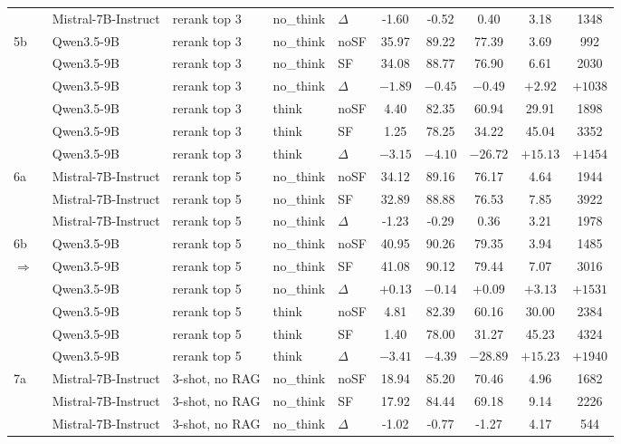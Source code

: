 \begin{scriptsize}
\begin{longtable}{l l l l l c c c c c}
 & Mistral-7B-Instruct & rerank top 3 & no\_think & $\Delta$ & -1.60 & -0.52 & 0.40 & 3.18 & 1348 \\
5b & Qwen3.5-9B & rerank top 3 & no\_think & noSF & 35.97 & 89.22 & 77.39 & 3.69 & 992 \\
 & Qwen3.5-9B & rerank top 3 & no\_think & SF & 34.08 & 88.77 & 76.90 & 6.61 & 2030 \\
 & Qwen3.5-9B & rerank top 3 & no\_think & $\Delta$ & $-1.89$ & $-0.45$ & $-0.49$ & $+2.92$ & $+1038$ \\
 & Qwen3.5-9B & rerank top 3 & think & noSF & 4.40 & 82.35 & 60.94 & 29.91 & 1898 \\
 & Qwen3.5-9B & rerank top 3 & think & SF & 1.25 & 78.25 & 34.22 & 45.04 & 3352 \\
 & Qwen3.5-9B & rerank top 3 & think & $\Delta$ & $-3.15$ & $-4.10$ & $-26.72$ & $+15.13$ & $+1454$ \\
\dmidrule
6a & Mistral-7B-Instruct & rerank top 5 & no\_think & noSF & 34.12 & 89.16 & 76.17 & 4.64 & 1944 \\
 & Mistral-7B-Instruct & rerank top 5 & no\_think & SF & 32.89 & 88.88 & 76.53 & 7.85 & 3922 \\
 & Mistral-7B-Instruct & rerank top 5 & no\_think & $\Delta$ & -1.23 & -0.29 & 0.36 & 3.21 & 1978 \\
6b & Qwen3.5-9B & rerank top 5 & no\_think & noSF & 40.95 & 90.26 & 79.35 & 3.94 & 1485 \\
\rowcolor{tabhighlight}$\Rightarrow$~ & Qwen3.5-9B & rerank top 5 & no\_think & SF & 41.08 & 90.12 & 79.44 & 7.07 & 3016 \\
 & Qwen3.5-9B & rerank top 5 & no\_think & $\Delta$ & $+0.13$ & $-0.14$ & $+0.09$ & $+3.13$ & $+1531$ \\
 & Qwen3.5-9B & rerank top 5 & think & noSF & 4.81 & 82.39 & 60.16 & 30.00 & 2384 \\
 & Qwen3.5-9B & rerank top 5 & think & SF & 1.40 & 78.00 & 31.27 & 45.23 & 4324 \\
 & Qwen3.5-9B & rerank top 5 & think & $\Delta$ & $-3.41$ & $-4.39$ & $-28.89$ & $+15.23$ & $+1940$ \\
\dmidrule
7a & Mistral-7B-Instruct & 3-shot, no RAG & no\_think & noSF & 18.94 & 85.20 & 70.46 & 4.96 & 1682 \\
 & Mistral-7B-Instruct & 3-shot, no RAG & no\_think & SF & 17.92 & 84.44 & 69.18 & 9.14 & 2226 \\
 & Mistral-7B-Instruct & 3-shot, no RAG & no\_think & $\Delta$ & -1.02 & -0.77 & -1.27 & 4.17 & 544 \\

\end{longtable}
\end{scriptsize}
